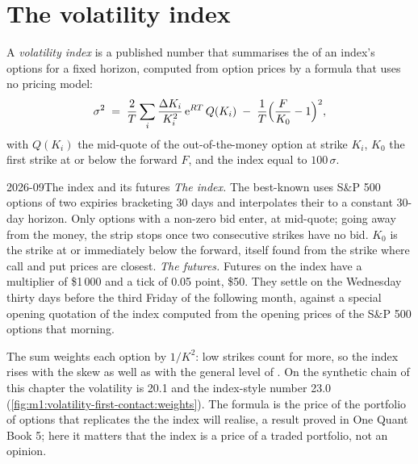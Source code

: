 \section{The volatility index}

\begin{definition}\label{def:m1:volatility-first-contact:vix}
A \emph{volatility index} is a published number that
summarises the  of an index's options for a fixed horizon,
computed from option prices by a formula that uses no pricing model:
\[
\sigma^2 \;=\; \frac{2}{T}\sum_i \frac{\Delta K_i}{K_i^2}\,\mathrm{e}^{RT}\,Q(K_i)
\;-\; \frac{1}{T}\Bigl(\frac{F}{K_0}-1\Bigr)^2 ,
\]
with $Q(K_i)$ the mid-quote of the out-of-the-money option at strike $K_i$,
$K_0$ the first strike at or below the forward $F$, and the index equal to
$100\,\sigma$.
\end{definition}

\begin{dated}{2026-09}{The index and its futures}\label{dat:m1:volatility-first-contact:vix}
\emph{The index.} The best-known  uses S\&P 500 options of
two expiries bracketing 30 days and interpolates their  to a constant
30-day horizon. Only options with a non-zero bid enter, at mid-quote; going
away from the money, the strip stops once two consecutive strikes have no
bid. $K_0$ is the strike at or immediately below the forward, itself found
from the strike where call and put prices are closest. \emph{The futures.}
Futures on the index have a multiplier of \$1\,000 and a tick of 0.05 point,
\$50. They settle on the Wednesday thirty days before the third Friday of the
following month, against a special opening quotation of the index computed
from the opening prices of the S\&P 500 options that morning.
\end{dated}

The sum weights each option by $1/K^2$: low strikes count for more, so the
index rises with the skew as well as with the general level of . On the synthetic chain of this chapter the 
volatility is 20.1 and the index-style number 23.0
(\cref{fig:m1:volatility-first-contact:weights}). The formula is the price of
the portfolio of options that replicates the \emph{} the index will
realise, a result proved in One Quant Book 5; here it matters that the
index is a price of a traded portfolio, not an opinion.

